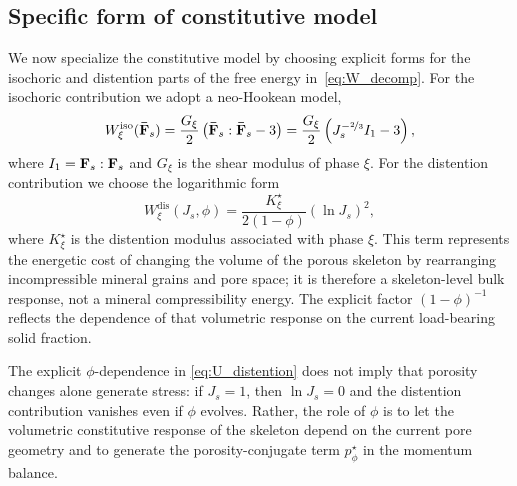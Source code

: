 \documentclass[11pt]{article}
\begin{document}
\subsection{Specific form of constitutive model}
%
We now specialize the constitutive model by choosing explicit forms for the isochoric and distention parts of the free energy in~\eqref{eq:W_decomp}.  For the isochoric contribution we adopt a neo-Hookean model,
%
\begin{align}
  W^{\text{iso}}_\xi(\mathbf{\bar F}_s) = \frac{G_\xi}{2}\left(\mathbf{\bar F}_s : \mathbf{\bar F}_s - 3\right) = \frac{G_\xi}{2}\left(J_s^{-\nicefrac{2}{3}} I_1 - 3\right),
\end{align}
%
where $I_1 = \mathbf{F}_s : \mathbf{F}_s$ and $G_\xi$ is the shear modulus of phase $\xi$. For the distention contribution we choose the logarithmic form
%
\begin{equation}
  W^{\text{dis}}_\xi(J_s,\phi) = \frac{K^\star_\xi}{2(1-\phi)}\left(\ln J_s\right)^2,
  \label{eq:U_distention}
\end{equation}
%
where $K^\star_\xi$ is the distention modulus associated with phase $\xi$.  This term represents the energetic cost of changing the volume of the porous skeleton by rearranging incompressible mineral grains and pore space; it is therefore a skeleton-level bulk response, not a mineral compressibility energy.  The explicit factor $(1-\phi)^{-1}$ reflects the dependence of that volumetric response on the current load-bearing solid fraction.

The explicit $\phi$-dependence in \eqref{eq:U_distention} does not imply that porosity changes alone generate stress: if $J_s=1$, then $\ln J_s = 0$ and the distention contribution vanishes even if $\phi$ evolves.  Rather, the role of $\phi$ is to let the volumetric constitutive response of the skeleton depend on the current pore geometry and to generate the porosity-conjugate term $p_\phi^\star$ in the momentum balance.
\end{document}
